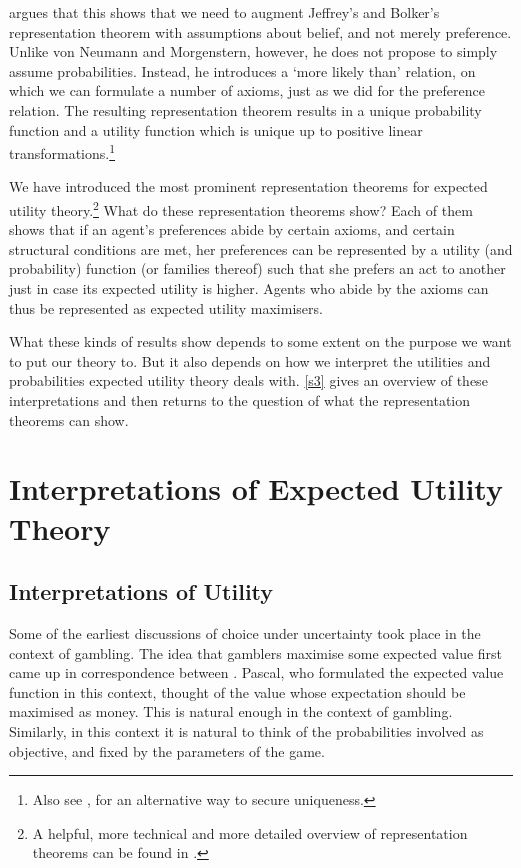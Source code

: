 \citet{Joyce1999} argues that this shows that we need to augment Jeffrey's and Bolker's representation theorem with assumptions about belief, and not merely preference. Unlike von Neumann and Morgenstern, however, he does not propose to simply assume probabilities. Instead, he introduces a `more likely than' relation, on which we can formulate a number of axioms, just as we did for the preference relation. The resulting representation theorem results in a unique probability function and a utility function which is unique up to positive linear transformations.\footnote{Also see \citet{Bradley1998}, for an alternative way to secure uniqueness.}

We have introduced the most prominent representation theorems for expected utility theory.\footnote{A helpful, more technical and more detailed overview of representation theorems can be found in \citet{Fishburn1981}.} What do these representation theorems show? Each of them shows that if an agent's preferences abide by certain axioms, and certain structural conditions are met, her preferences can be represented by a utility (and probability) function (or families thereof) such that she prefers an act to another just in case its expected utility is higher. Agents who abide by the axioms can thus be represented as expected utility maximisers.

What these kinds of results show depends to some extent on the purpose we want to put our theory to. But it also depends on how we interpret the utilities and probabilities expected utility theory deals with. \autoref{s3} gives an overview of these interpretations and then returns to the question of what the representation theorems can show.

\section{Interpretations of Expected Utility Theory} \label{s3}

\subsection{Interpretations of Utility}\label{subs31}

Some of the earliest discussions of choice under uncertainty took place in the context of gambling. The idea that gamblers maximise some expected value first came up in correspondence between \citet{FermatPascal1654}. Pascal, who formulated the expected value function in this context, thought of the value whose expectation should be maximised as money. This is natural enough in the context of gambling. Similarly, in this context it is natural to think of the probabilities involved as objective, and fixed by the parameters of the game.

